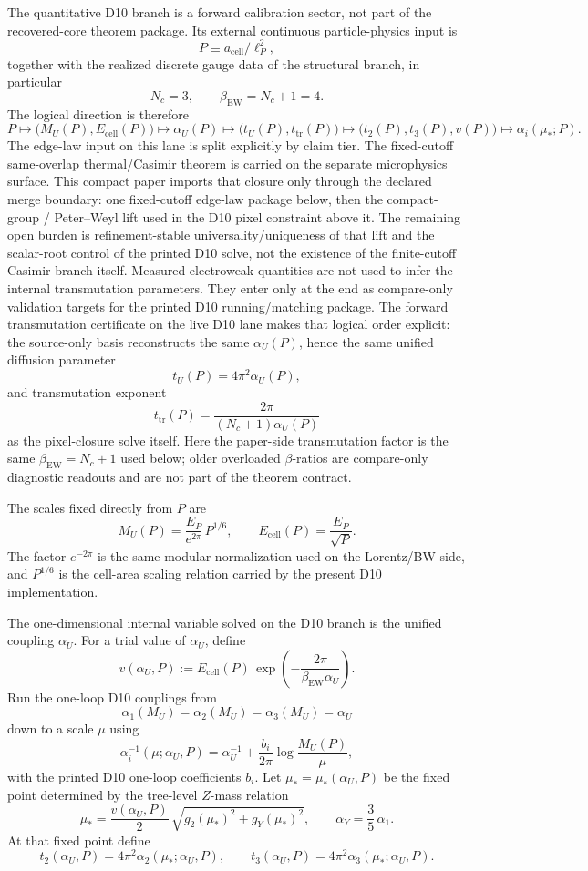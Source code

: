 \documentclass[11pt]{article}
\begin{document}
The quantitative D10 branch is a forward calibration sector, not part of the recovered-core theorem package. Its external continuous particle-physics input is
\[
P \equiv a_{\mathrm{cell}}/\ell_P^2,
\]
together with the realized discrete gauge data of the structural branch, in particular
\[
N_c=3,
\qquad
\beta_{\mathrm{EW}}=N_c+1=4.
\]
The logical direction is therefore
\[
P
\longmapsto
\bigl(M_U(P),E_{\mathrm{cell}}(P)\bigr)
\longmapsto
\alpha_U(P)
\longmapsto
\bigl(t_U(P),t_{\mathrm{tr}}(P)\bigr)
\longmapsto
\bigl(t_2(P),t_3(P),v(P)\bigr)
\longmapsto
\alpha_i(\mu_\ast;P).
\]
The edge-law input on this lane is split explicitly by claim tier. The fixed-cutoff
same-overlap thermal/Casimir theorem is carried on the separate microphysics surface. This
compact paper imports that closure only through the declared merge boundary: one fixed-cutoff
edge-law package below, then the compact-group / Peter--Weyl lift used in the D10 pixel
constraint above it. The remaining open burden is refinement-stable universality/uniqueness of
that lift and the scalar-root control of the printed D10 solve, not the existence of the
finite-cutoff Casimir branch itself.
Measured electroweak quantities are not used to infer the internal transmutation parameters. They enter only at the end as compare-only validation targets for the printed D10 running/matching package.
The forward transmutation certificate on the live D10 lane makes that logical order explicit: the source-only basis reconstructs the same \(\alpha_U(P)\), hence the same unified diffusion parameter
\[
t_U(P)=4\pi^2\alpha_U(P),
\]
and transmutation exponent
\[
t_{\mathrm{tr}}(P)=\frac{2\pi}{(N_c+1)\alpha_U(P)}
\]
as the pixel-closure solve itself. Here the paper-side transmutation factor is the same
\(\beta_{\mathrm{EW}}=N_c+1\) used below; older overloaded \(\beta\)-ratios are compare-only
diagnostic readouts and are not part of the theorem contract.

The scales fixed directly from \(P\) are
\[
M_U(P)=\frac{E_P}{e^{2\pi}}\,P^{1/6},
\qquad
E_{\mathrm{cell}}(P)=\frac{E_P}{\sqrt P}.
\]
The factor \(e^{-2\pi}\) is the same modular normalization used on the Lorentz/BW side, and \(P^{1/6}\) is the cell-area scaling relation carried by the present D10 implementation.

The one-dimensional internal variable solved on the D10 branch is the unified coupling \(\alpha_U\). For a trial value of \(\alpha_U\), define
\[
v(\alpha_U,P)
:=
E_{\mathrm{cell}}(P)\,
\exp\!\left(-\frac{2\pi}{\beta_{\mathrm{EW}}\alpha_U}\right).
\]
Run the one-loop D10 couplings from
\[
\alpha_1(M_U)=\alpha_2(M_U)=\alpha_3(M_U)=\alpha_U
\]
down to a scale \(\mu\) using
\[
\alpha_i^{-1}(\mu;\alpha_U,P)
=
\alpha_U^{-1}
+
\frac{b_i}{2\pi}\log\frac{M_U(P)}{\mu},
\]
with the printed D10 one-loop coefficients \(b_i\). Let \(\mu_\ast=\mu_\ast(\alpha_U,P)\) be the fixed point determined by the tree-level \(Z\)-mass relation
\[
\mu_\ast
=
\frac{v(\alpha_U,P)}{2}\,
\sqrt{g_2(\mu_\ast)^2+g_Y(\mu_\ast)^2},
\qquad
\alpha_Y=\frac35\,\alpha_1.
\]
At that fixed point define
\[
t_2(\alpha_U,P)=4\pi^2\alpha_2(\mu_\ast;\alpha_U,P),
\qquad
t_3(\alpha_U,P)=4\pi^2\alpha_3(\mu_\ast;\alpha_U,P).
\]
\end{document}
